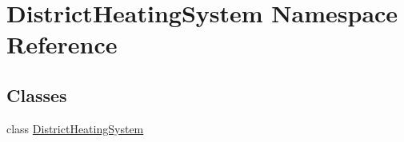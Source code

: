 \hypertarget{namespace_district_heating_system}{}\section{District\+Heating\+System Namespace Reference}
\label{namespace_district_heating_system}
\subsection*{Classes}
\begin{DoxyCompactItemize}
\item 
class \hyperlink{class_district_heating_system_1_1_district_heating_system}{District\+Heating\+System}
\end{DoxyCompactItemize}
